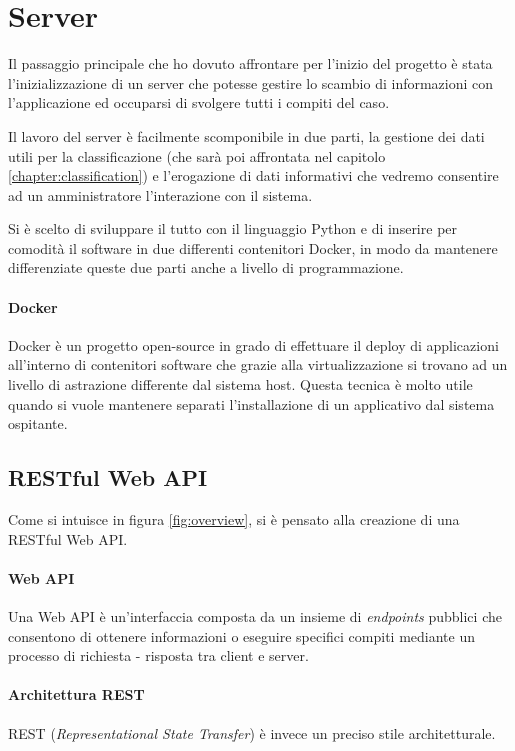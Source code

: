 \chapter{Server}
Il passaggio principale che ho dovuto affrontare per l'inizio del progetto è stata l'inizializzazione
di un server che potesse gestire lo scambio di informazioni con l'applicazione ed occuparsi di svolgere tutti i compiti del caso.

Il lavoro del server è facilmente scomponibile in due parti, la gestione dei dati utili per la classificazione 
(che sarà poi affrontata nel capitolo \ref{chapter:classification}) e l'erogazione di dati informativi che vedremo consentire
ad un amministratore l'interazione con il sistema.

Si è scelto di sviluppare il tutto con il linguaggio Python e di inserire per comodità il software in due differenti contenitori Docker, in modo da 
mantenere differenziate queste due parti anche a livello di programmazione.

\subsubsection{Docker}
Docker \cite{docker} è un progetto open-source in grado di effettuare il deploy di applicazioni all'interno di contenitori software che grazie alla
virtualizzazione si trovano ad un livello di astrazione differente dal sistema host. Questa tecnica è molto utile quando si vuole
mantenere separati l'installazione di un applicativo dal sistema ospitante.



\section{RESTful Web API}
\label{section:api}
Come si intuisce in figura \ref{fig:overview}, si è pensato alla creazione di una RESTful Web API.

\subsubsection{Web API}
Una Web API è un'interfaccia composta da un insieme di \textit{endpoints} pubblici che consentono di ottenere informazioni 
o eseguire specifici compiti mediante un processo di richiesta - risposta tra client e server. 

\subsubsection{Architettura REST}
REST (\textit{Representational State Transfer}) è invece un preciso stile architetturale. 

